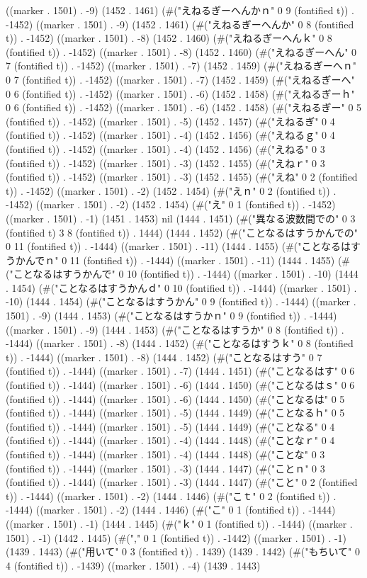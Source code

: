 ((marker . 1501) . -9) (1452 . 1461) (#("えねるぎーへんかｎ" 0 9 (fontified t)) . -1452) ((marker . 1501) . -9) (1452 . 1461) (#("えねるぎーへんか" 0 8 (fontified t)) . -1452) ((marker . 1501) . -8) (1452 . 1460) (#("えねるぎーへんｋ" 0 8 (fontified t)) . -1452) ((marker . 1501) . -8) (1452 . 1460) (#("えねるぎーへん" 0 7 (fontified t)) . -1452) ((marker . 1501) . -7) (1452 . 1459) (#("えねるぎーへｎ" 0 7 (fontified t)) . -1452) ((marker . 1501) . -7) (1452 . 1459) (#("えねるぎーへ" 0 6 (fontified t)) . -1452) ((marker . 1501) . -6) (1452 . 1458) (#("えねるぎーｈ" 0 6 (fontified t)) . -1452) ((marker . 1501) . -6) (1452 . 1458) (#("えねるぎー" 0 5 (fontified t)) . -1452) ((marker . 1501) . -5) (1452 . 1457) (#("えねるぎ" 0 4 (fontified t)) . -1452) ((marker . 1501) . -4) (1452 . 1456) (#("えねるｇ" 0 4 (fontified t)) . -1452) ((marker . 1501) . -4) (1452 . 1456) (#("えねる" 0 3 (fontified t)) . -1452) ((marker . 1501) . -3) (1452 . 1455) (#("えねｒ" 0 3 (fontified t)) . -1452) ((marker . 1501) . -3) (1452 . 1455) (#("えね" 0 2 (fontified t)) . -1452) ((marker . 1501) . -2) (1452 . 1454) (#("えｎ" 0 2 (fontified t)) . -1452) ((marker . 1501) . -2) (1452 . 1454) (#("え" 0 1 (fontified t)) . -1452) ((marker . 1501) . -1) (1451 . 1453) nil (1444 . 1451) (#("異なる波数間での" 0 3 (fontified t) 3 8 (fontified t)) . 1444) (1444 . 1452) (#("ことなるはすうかんでの" 0 11 (fontified t)) . -1444) ((marker . 1501) . -11) (1444 . 1455) (#("ことなるはすうかんでｎ" 0 11 (fontified t)) . -1444) ((marker . 1501) . -11) (1444 . 1455) (#("ことなるはすうかんで" 0 10 (fontified t)) . -1444) ((marker . 1501) . -10) (1444 . 1454) (#("ことなるはすうかんｄ" 0 10 (fontified t)) . -1444) ((marker . 1501) . -10) (1444 . 1454) (#("ことなるはすうかん" 0 9 (fontified t)) . -1444) ((marker . 1501) . -9) (1444 . 1453) (#("ことなるはすうかｎ" 0 9 (fontified t)) . -1444) ((marker . 1501) . -9) (1444 . 1453) (#("ことなるはすうか" 0 8 (fontified t)) . -1444) ((marker . 1501) . -8) (1444 . 1452) (#("ことなるはすうｋ" 0 8 (fontified t)) . -1444) ((marker . 1501) . -8) (1444 . 1452) (#("ことなるはすう" 0 7 (fontified t)) . -1444) ((marker . 1501) . -7) (1444 . 1451) (#("ことなるはす" 0 6 (fontified t)) . -1444) ((marker . 1501) . -6) (1444 . 1450) (#("ことなるはｓ" 0 6 (fontified t)) . -1444) ((marker . 1501) . -6) (1444 . 1450) (#("ことなるは" 0 5 (fontified t)) . -1444) ((marker . 1501) . -5) (1444 . 1449) (#("ことなるｈ" 0 5 (fontified t)) . -1444) ((marker . 1501) . -5) (1444 . 1449) (#("ことなる" 0 4 (fontified t)) . -1444) ((marker . 1501) . -4) (1444 . 1448) (#("ことなｒ" 0 4 (fontified t)) . -1444) ((marker . 1501) . -4) (1444 . 1448) (#("ことな" 0 3 (fontified t)) . -1444) ((marker . 1501) . -3) (1444 . 1447) (#("ことｎ" 0 3 (fontified t)) . -1444) ((marker . 1501) . -3) (1444 . 1447) (#("こと" 0 2 (fontified t)) . -1444) ((marker . 1501) . -2) (1444 . 1446) (#("こｔ" 0 2 (fontified t)) . -1444) ((marker . 1501) . -2) (1444 . 1446) (#("こ" 0 1 (fontified t)) . -1444) ((marker . 1501) . -1) (1444 . 1445) (#("ｋ" 0 1 (fontified t)) . -1444) ((marker . 1501) . -1) (1442 . 1445) (#("," 0 1 (fontified t)) . -1442) ((marker . 1501) . -1) (1439 . 1443) (#("用いて" 0 3 (fontified t)) . 1439) (1439 . 1442) (#("もちいて" 0 4 (fontified t)) . -1439) ((marker . 1501) . -4) (1439 . 1443) 
